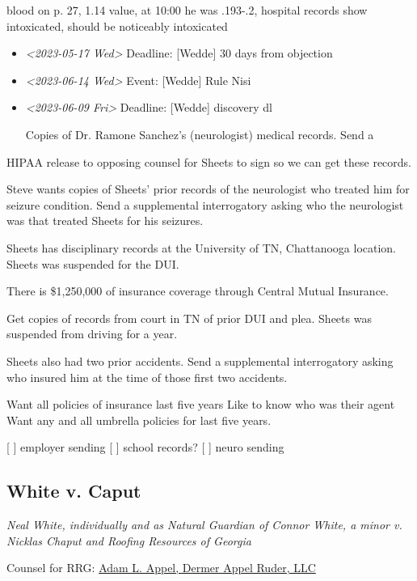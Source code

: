 \documentclass[11pt]{article}
\begin{document}
blood on p. 27, 1.14 value, at 10:00 he was .193-.2, hospital records show intoxicated, should be noticeably intoxicated

\begin{itemize}
\item \textit{<2023-05-17 Wed> } Deadline: [Wedde] 30 days from objection

\item \textit{<2023-06-14 Wed> } Event: [Wedde] Rule Nisi

\item \textit{<2023-06-09 Fri> } Deadline: [Wedde] discovery dl

Copies of Dr. Ramone Sanchez’s (neurologist) medical records. Send a
\end{itemize}
HIPAA release to opposing counsel for Sheets to sign so we can get
these records.

Steve wants copies of Sheets’ prior records of the neurologist who
treated him for seizure condition. Send a supplemental interrogatory
asking who the neurologist was that treated Sheets for his seizures.

Sheets has disciplinary records at the University of TN, Chattanooga
location. Sheets was suspended for the DUI.

There is \$1,250,000 of insurance coverage through Central Mutual Insurance.

Get copies of records from court in TN of prior DUI and plea. Sheets
was suspended from driving for a year.

Sheets also had two prior accidents. Send a supplemental interrogatory
asking who insured him at the time of those first two accidents.

Want all policies of insurance last five years
Like to know who was their agent
Want any and all umbrella policies for last five years.

[ ] employer sending
[ ] school records?
[ ] neuro sending

\subsection*{White v. Caput}
\label{sec:org05da139}

\emph{Neal White, individually and as Natural Guardian of Connor White, a minor v. Nicklas Chaput and Roofing Resources of Georgia}

Counsel for RRG: \href{https://www.gabar.org/MemberSearchDetail.cfm?ID=MDIwNzY1}{Adam L. Appel, Dermer Appel Ruder, LLC}
\end{document}
